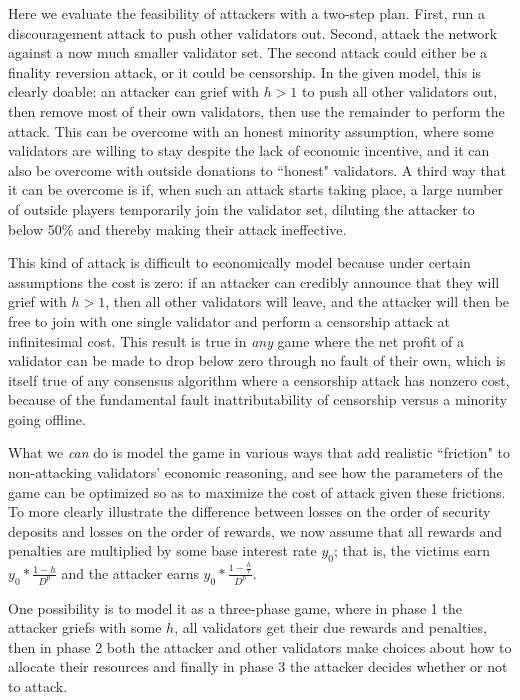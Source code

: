 \documentclass[12pt]{article}
\begin{document}
Here we evaluate the feasibility of attackers with a two-step plan. First, run a discouragement attack to push other validators out. Second, attack the network against a now much smaller validator set. The second attack could either be a finality reversion attack, or it could be censorship. In the given model, this is clearly doable: an attacker can grief with $h > 1$ to push all other validators out, then remove most of their own validators, then use the remainder to perform the attack. This can be overcome with an honest minority assumption, where some validators are willing to stay despite the lack of economic incentive, and it can also be overcome with outside donations to ``honest" validators. A third way that it can be overcome is if, when such an attack starts taking place, a large number of outside players temporarily join the validator set, diluting the attacker to below $50\%$ and thereby making their attack ineffective.

This kind of attack is difficult to economically model because under certain assumptions the cost is zero: if an attacker can credibly announce that they will grief with $h > 1$, then all other validators will leave, and the attacker will then be free to join with one single validator and perform a censorship attack at infinitesimal cost. This result is true in \textit{any} game where the net profit of a validator can be made to drop below zero through no fault of their own, which is itself true of any consensus algorithm where a censorship attack has nonzero cost, because of the fundamental fault inattributability of censorship versus a minority going offline.

What we \textit{can} do is model the game in various ways that add realistic ``friction" to non-attacking validators' economic reasoning, and see how the parameters of the game can be optimized so as to maximize the cost of attack given these frictions. To more clearly illustrate the difference between losses on the order of security deposits and losses on the order of rewards, we now assume that all rewards and penalties are multiplied by some base interest rate $y_0$; that is, the victims earn $y_0 * \frac{1 - h}{D^p}$ and the attacker earns $y_0 * \frac{1 - \frac{h}{r}}{D^p}$.

One possibility is to model it as a three-phase game, where in phase 1 the attacker griefs with some $h$, all validators get their due rewards and penalties, then in phase 2 both the attacker and other validators make choices about how to allocate their resources and finally in phase 3 the attacker decides whether or not to attack.
\end{document}
